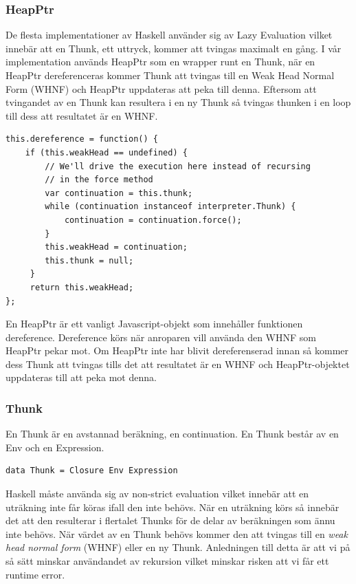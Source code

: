 \subsubsection{HeapPtr}
De flesta implementationer av Haskell använder sig av Lazy Evaluation vilket innebär att en Thunk, ett uttryck, kommer att tvingas maximalt en gång. I vår implementation används HeapPtr som en wrapper runt en Thunk, när en HeapPtr dereferenceras kommer Thunk att tvingas till en Weak Head Normal Form (WHNF) och HeapPtr uppdateras att peka till denna. Eftersom att tvingandet av en Thunk kan resultera i en ny Thunk så tvingas thunken i en loop till dess att resultatet är en WHNF.

\begin{lstlisting}
this.dereference = function() {
    if (this.weakHead == undefined) {
        // We'll drive the execution here instead of recursing 
        // in the force method
        var continuation = this.thunk;
        while (continuation instanceof interpreter.Thunk) {
            continuation = continuation.force();
        }
        this.weakHead = continuation;
        this.thunk = null;
     }
     return this.weakHead;
};
\end{lstlisting}
En HeapPtr är ett vanligt Javascript-objekt som innehåller funktionen dereference. Dereference körs när anroparen vill använda den WHNF som HeapPtr pekar mot. Om HeapPtr inte har blivit dereferenserad innan så kommer dess Thunk att tvingas tills det att resultatet är en WHNF och HeapPtr-objektet uppdateras till att peka mot denna.

\subsubsection{Thunk}
En Thunk är en avstannad beräkning, en continuation. En Thunk består av en Env och en Expression.

\begin{lstlisting}
data Thunk = Closure Env Expression
\end{lstlisting}

Haskell måste använda sig av non-strict evaluation vilket innebär att en uträkning inte får köras ifall den inte behövs. När en uträkning körs så innebär det att den resulterar i flertalet Thunks för de delar av beräkningen som ännu inte behövs. När värdet av en Thunk behövs kommer den att tvingas till en \emph{weak head normal form} (WHNF) eller en ny Thunk. Anledningen till detta är att vi på så sätt minskar användandet av rekursion vilket minskar risken att vi får ett runtime error.

